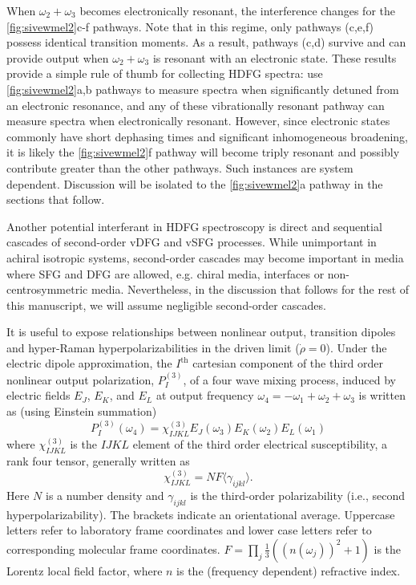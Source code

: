 \documentclass[aip, jcp, reprint, onecolumn, nofootinbib]{revtex4-2}
\begin{document}
When $\omega_2 + \omega_3$ becomes electronically resonant, the interference changes for the \autoref{fig:sivewmel2}c-f pathways.
Note that in this regime, only pathways (c,e,f) possess identical transition moments.
As a result, pathways (c,d) survive and can provide output when $\omega_2+\omega_3$ is resonant with an electronic state. 
These results provide a simple rule of thumb for collecting HDFG spectra: use \autoref{fig:sivewmel2}a,b pathways to measure spectra when significantly detuned from an electronic resonance, and any of these vibrationally resonant pathway can measure spectra when electronically resonant.
However, since electronic states commonly have short dephasing times and significant inhomogeneous broadening,\cite{Dong2015, Lewis2015} it is likely the \autoref{fig:sivewmel2}f pathway will become triply resonant and possibly contribute greater than the other pathways. 
Such instances are system dependent. 
Discussion will be isolated to the \autoref{fig:sivewmel2}a pathway in the sections that follow.

Another potential interferant in HDFG spectroscopy is direct and sequential cascades of second-order vDFG and vSFG processes.\cite{RN297, RN301}
While unimportant in achiral isotropic systems,\cite{Belkin2000} second-order cascades may become important in media where SFG and DFG are allowed, e.g. chiral media, interfaces or non-centrosymmetric media. 
Nevertheless, in the discussion that follows for the rest of this manuscript, we will assume negligible second-order cascades. 

It is useful to expose relationships between nonlinear output, transition dipoles and hyper-Raman hyperpolarizabilities in the driven limit ($\dot{\rho} = 0$). \cite{Simpson2004, Moad2005}
Under the electric dipole approximation, the $I^\text{th}$ cartesian component of the third order nonlinear output polarization, ${P}^{(3)}_I$, of a four wave mixing process, induced by electric fields $E_J$, $E_K$, and $E_L$ at output frequency $\omega_4=-\omega_1 + \omega_2 + \omega_3$ is written as (using Einstein summation) \cite{RN307}
\begin{equation} \label{polarization}
{P}^{(3)}_I (\omega_4)  = \chi^{(3)}_{IJKL} E_J(\omega_3) E_K(\omega_2) E_L(\omega_1) 
\end{equation}
where $\chi^{(3)}_{IJKL}$ is the $IJKL$ element of the third order electrical susceptibility, a rank four tensor, generally written as
\begin{equation}\label{eq:nfgamma}
	\chi^{(3)}_{IJKL} = NF \langle \gamma_{ijkl} \rangle.
\end{equation}
Here $N$ is a number density and $\gamma_{ijkl}$ is the third-order polarizability (i.e., second hyperpolarizability).
The brackets indicate an orientational average.\cite{Andrews1977}
Uppercase letters refer to laboratory frame coordinates and lower case letters refer to corresponding molecular frame coordinates.
$F=\prod_j  \frac{1}{3} \left({\left(n(\omega_j)\right)^2 + 1} \right)$ is the Lorentz local field factor, where $n$ is the (frequency dependent) refractive index. \cite{Bedeaux1973}
\end{document}
